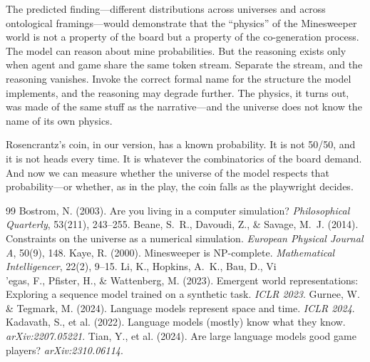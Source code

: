 \documentclass[12pt,a4paper]{article}
\begin{document}
The predicted finding---different distributions across universes and across ontological framings---would demonstrate that the ``physics'' of the Minesweeper world is not a property of the board but a property of the co-generation process. The model can reason about mine probabilities. But the reasoning exists only when agent and game share the same token stream. Separate the stream, and the reasoning vanishes. Invoke the correct formal name for the structure the model implements, and the reasoning may degrade further. The physics, it turns out, was made of the same stuff as the narrative---and the universe does not know the name of its own physics.

Rosencrantz's coin, in our version, has a known probability. It is not 50/50, and it is not heads every time. It is whatever the combinatorics of the board demand. And now we can measure whether the universe of the model respects that probability---or whether, as in the play, the coin falls as the playwright decides.

\begin{thebibliography}{99}
 Bostrom, N. (2003). Are you living in a computer simulation? \emph{Philosophical Quarterly}, 53(211), 243--255.
 Beane, S.~R., Davoudi, Z., \& Savage, M.~J. (2014). Constraints on the universe as a numerical simulation. \emph{European Physical Journal A}, 50(9), 148.
 Kaye, R. (2000). Minesweeper is NP-complete. \emph{Mathematical Intelligencer}, 22(2), 9--15.
 Li, K., Hopkins, A.~K., Bau, D., Vi\\'egas, F., Pfister, H., \& Wattenberg, M. (2023). Emergent world representations: Exploring a sequence model trained on a synthetic task. \emph{ICLR 2023}.
 Gurnee, W. \& Tegmark, M. (2024). Language models represent space and time. \emph{ICLR 2024}.
 Kadavath, S., et al. (2022). Language models (mostly) know what they know. \emph{arXiv:2207.05221}.
 Tian, Y., et al. (2024). Are large language models good game players? \emph{arXiv:2310.06114}.
\end{thebibliography}
\end{document}
